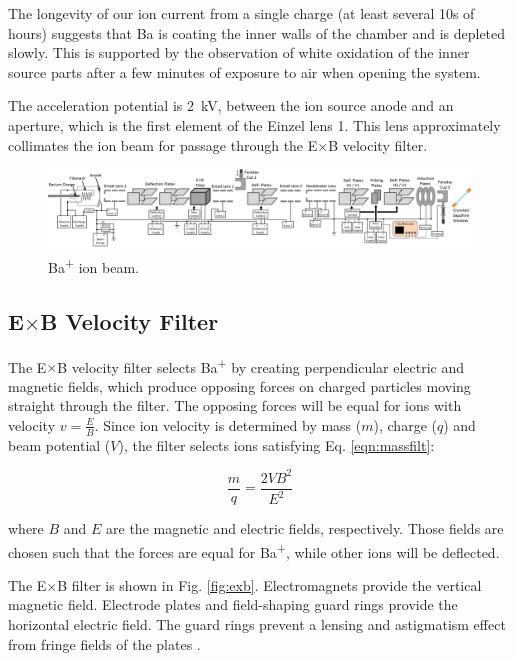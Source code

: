 The longevity of our ion current from a single charge (at least several 10s of hours) suggests that Ba is coating the inner walls of the chamber and is depleted slowly.  This is supported by the observation of white oxidation of the inner source parts after a few minutes of exposure to air when opening the system.

The acceleration potential is 2~kV, between the ion source anode and an aperture, which is the first element of the Einzel lens 1.  This lens approximately collimates the ion beam for passage through the E$\times$B velocity filter.

\begin{figure}[H]
        \centering
                \includegraphics[width=1.\textwidth]{figures/ionBeam.png}
                \caption{Ba\textsuperscript{+} ion beam.}
\label{fig:ionbeam}
\end{figure}

\subsection{E$\times$B Velocity Filter}

The E$\times$B velocity filter selects Ba\textsuperscript{+} by creating perpendicular electric and magnetic fields, which produce opposing forces on charged particles moving straight through the filter.  The opposing forces will be equal for ions with velocity $v = \frac{E}{B}$.  Since ion velocity is determined by mass ($m$), charge ($q$) and beam potential ($V$), the filter selects ions satisfying Eq. \ref{eqn:massfilt}:

\begin{equation}
\frac{m}{q} = \frac{2 V B^{2}}{E^{2}}
\label{eqn:massfilt}
\end{equation}

\noindent
where $B$ and $E$ are the magnetic and electric fields, respectively.  Those fields are chosen such that the forces are equal for Ba\textsuperscript{+}, while other ions will be deflected.  

The E$\times$B filter is shown in Fig. \ref{fig:exb}.  Electromagnets provide the vertical magnetic field.  Electrode plates and field-shaping guard rings provide the horizontal electric field.  The guard rings prevent a lensing and astigmatism effect from fringe fields of the plates \cite{Colutron}.

